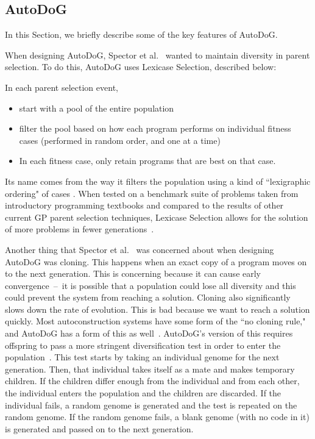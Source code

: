\documentclass{sig-alternate}
\begin{document}
\subsection{AutoDoG}
\label{sec:autodog}
In this Section, we briefly describe some of the key features of AutoDoG.

When designing AutoDoG, Spector et al.~\cite{spector:2016} wanted to maintain diversity in parent selection. To do this, AutoDoG uses Lexicase Selection, described below: 

In each parent selection event,
\begin{itemize}
	\item start with a pool of the entire population
	\item filter the pool based on how each program performs on individual fitness cases (performed in random order, and one at a time)
	\item In each fitness case, only retain programs that are best on that case.
\end{itemize}

Its name comes from the way it filters the population using a kind of ``lexigraphic ordering" of cases \cite{spector:2016}. When tested on a benchmark suite of problems taken from introductory programming textbooks and compared to the results of other current GP parent selection techniques, Lexicase Selection allows for the solution of more problems in fewer generations~\cite{spector:2016}.

Another thing that Spector et al.~\cite{spector:2016} was concerned about when designing AutoDoG was cloning. This happens when an exact copy of a program moves on to the next generation. This is concerning because it can cause early convergence~--~it is possible that a population could lose all diversity and this could prevent the system from reaching a solution.
Cloning also significantly slows down the rate of evolution. This is bad because we want to reach a solution quickly. Most autoconstruction systems have some form of the ``no cloning rule," and AutoDoG has a form of this as well~\cite{spector:2016}. AutoDoG's version of this requires offspring to pass a more stringent diversification test in order to enter the population~\cite{spector:2016}. This test starts by taking an individual genome for the next generation. Then, that individual takes itself as a mate and makes temporary children. If the children differ enough from the individual and from each other, the individual enters the population and the children are discarded. If the individual fails, a random genome is generated and the test is repeated on the random genome. If the random genome fails, a blank genome (with no code in it) is generated and passed on to the next generation.
\end{document}
